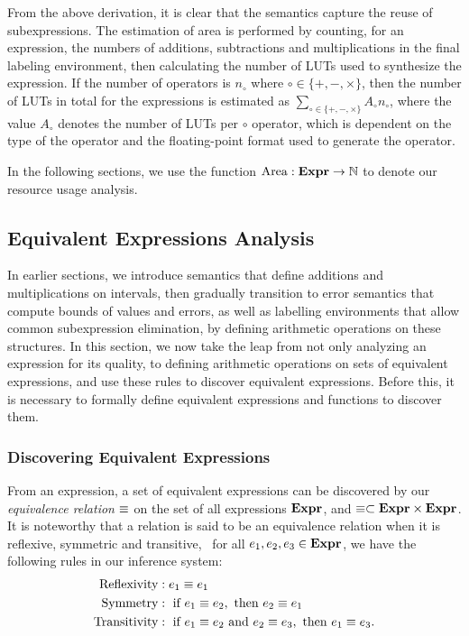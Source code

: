 From the above derivation, it is clear that the semantics capture the reuse
of subexpressions. The estimation of area is performed by counting, for an
expression, the numbers of additions, subtractions and multiplications in
the final labeling environment, then calculating the number of LUTs used to
synthesize the expression. If the number of operators is $n_\circ$ where
$\circ\in\{+,-,\times\}$, then the number of LUTs in total for the expressions
is estimated as $\sum_{\circ\in\{+,-,\times\}} A_\circ n_\circ$, where the
value $A_\circ$ denotes the number of LUTs per $\circ$ operator, which is
dependent on the type of the operator and the floating-point format used to
generate the operator.

In the following sections, we use the function $\operatorname{\mathrm{Area}}: \mathbf{Expr}\to\mathbb{N}$
to denote our resource usage analysis.

\subsection{Equivalent Expressions Analysis}
\label{sub:equivalent_expressions_analysis}

In earlier sections, we introduce semantics that define additions and
multiplications on intervals, then gradually transition to error semantics that
compute bounds of values and errors, as well as labelling environments that
allow common subexpression elimination, by defining arithmetic operations on
these structures. In this section, we now take the leap from not only analyzing
an expression for its quality, to defining arithmetic operations on sets of
equivalent expressions, and use these rules to discover equivalent expressions.
Before this, it is necessary to formally define equivalent expressions and
functions to discover them.

\subsubsection{Discovering Equivalent Expressions}

From an expression, a set of equivalent expressions can be discovered by our
\emph{equivalence relation} $\equiv$ on the set of all expressions $\mathbf{Expr}$,
and $\equiv \subset \mathbf{Expr}\times\mathbf{Expr}$.  It is noteworthy that a relation
is said to be an equivalence relation when it is reflexive, symmetric and
transitive, \ie~for all $e_1, e_2, e_3 \in \mathbf{Expr}$, we have the following
rules in our inference system:
\begin{equation}
    \begin{aligned}
        \text{Reflexivity}
            &: e_1 \equiv e_1 \\
        \text{Symmetry}
            &: \text{~if~} e_1 \equiv e_2,
            \text{~then~} e_2 \equiv e_1 \\
        \text{Transitivity}
            &: \text{~if~} e_1 \equiv e_2 \text{~and~} e_2 \equiv e_3,
            \text{~then~} e_1 \equiv e_3.
    \end{aligned}
\end{equation}

